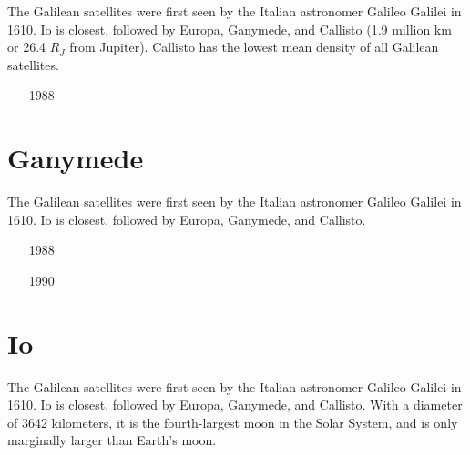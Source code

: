 The Galilean satellites were first seen by the Italian astronomer Galileo Galilei in 1610. 
Io is closest, followed by Europa, Ganymede, and Callisto (1.9 million km or
26.4 $R_J$ from Jupiter). Callisto has the lowest mean density of all Galilean satellites.

\begin{small}
\begin{itemize}
\item[1988]
\item[\twothousandfour]
\item[\twothousandfive]
\item[\twothousandsix]
\end{itemize}
\end{small}

\section{Ganymede}

The Galilean satellites were first seen by the Italian astronomer Galileo Galilei in 1610. 
Io is closest, followed by Europa, Ganymede, and Callisto.

\begin{small}
\begin{itemize}
\item[1988]
 \\ 
\item[1990]
\item[\twothousandsix]
\item[\twothousandfourteen]
\end{itemize}
\end{small}


\section{Io}

The Galilean satellites were first seen by the Italian astronomer Galileo Galilei in 1610. 
Io is closest, followed by Europa, Ganymede, and Callisto.
With a diameter of 3642 kilometers, it is the fourth-largest moon in the Solar System, 
and is only marginally larger than Earth's moon.


